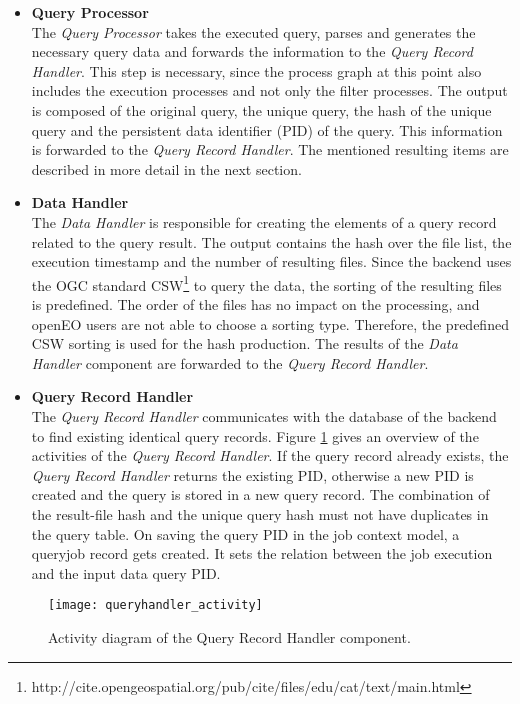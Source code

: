\documentclass[draft,final]{vutinfth} %
\begin{document}
 \begin{itemize}
	\item \textbf{Query Processor} \\
	The \textit{Query Processor} takes the executed query, parses and generates the necessary query data and forwards the information to the \textit{Query Record Handler}. This step is necessary, since the process graph at this point also includes the execution processes and not only the filter processes. The output is composed of the original query, the unique query, the hash of the unique query and the persistent data identifier (PID) of the query. This information is forwarded to the \textit{Query Record Handler}. The mentioned resulting items are described in more detail in the next section.   
	\item \textbf{Data Handler} \\ 
	The \textit{Data Handler} is responsible for creating the elements of a query record related to the query result. The output contains the hash over the file list, the execution timestamp and the number of resulting files. Since the backend uses the OGC standard CSW\footnote{http://cite.opengeospatial.org/pub/cite/files/edu/cat/text/main.html} to query the data, the sorting of the resulting files is predefined. The order of the files has no impact on the processing, and openEO users are not able to choose a sorting type. Therefore, the predefined CSW sorting is used for the hash production. The results of the \textit{Data Handler} component are forwarded to the \textit{Query Record Handler}.    
	\item \textbf{Query Record Handler} \\
	The \textit{Query Record Handler} communicates with the database of the backend to find existing identical query records. Figure \ref{fig:queryhandler_activity} gives an overview of the activities of the \textit{Query Record Handler}. If the query record already exists, the \textit{Query Record Handler} returns the existing PID, otherwise a new PID is created and the query is stored in a new query record. The combination of the result-file hash and the unique query hash must not have duplicates in the query table. On saving the query PID in the job context model, a queryjob record gets created. It sets the relation between the job execution and the input data query PID. 
\end{itemize}

\begin{figure}[h]
	\centering
	\texttt{[image: queryhandler\_activity]}
	\caption{Activity diagram of the Query Record Handler component.}
	\label{fig:queryhandler_activity} %
\end{figure}
\end{document}
